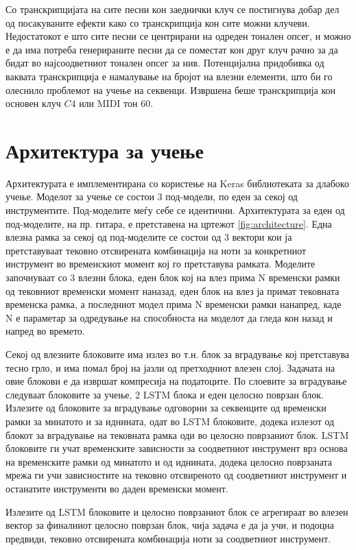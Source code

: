 Со транскрипцијата на сите песни кон заеднички клуч се постигнува добар дел од посакуваните ефекти како со транскрипција кон сите можни клучеви. Недостатокот е што сите песни се центрирани на одреден тонален опсег, и можно е да има потреба генерираните песни да се поместат кон друг клуч рачно за да бидат во најсоодветниот тонален опсег за нив. Потенцијална придобивка од ваквата транскрипција е намалување на бројот на влезни елементи, што би го олеснило проблемот на учење на секвенци. Извршена беше транскрипција кон основен клуч $C4$ или MIDI тон 60.

\section{Архитектура за учење}

Архитектурата е имплементирана со користење на Keras библиотеката за длабоко учење. Моделот за учење се состои 3 под-модели, по еден за секој од инструментите. Под-моделите меѓу себе се идентични. Архитектурата за еден од под-моделите, на пр. гитара, е претставена на цртежот \ref{fig:architecture}. Една влезна рамка за секој од под-моделите се состои од 3 вектори кои ја претставуваат тековно отсвирената комбинација на ноти за конкретниот инструмент во временскиот момент кој го претставува рамката. Моделите започнуваат со 3 влезни блока, еден блок кој на влез прима N временски рамки од тековниот временски момент наназад, еден блок на влез ја примат тековната временска рамка, а последниот модел прима N временски рамки нанапред, каде N е параметар за одредување на способноста на моделот да гледа кон назад и напред во времето.

Секој од влезните блоковите има излез во т.н. блок за вградување кој претставува тесно грло, и има помал број на јазли од претходниот влезен слој. Задачата на овие блокови е да извршат компресија на податоците. По слоевите за вградување следуваат блоковите за учење, 2 LSTM блока и еден целосно поврзан блок. Излезите од блоковите за вградување одговорни за секвенците од временски рамки за минатото и за иднината, одат во LSTM блоковите, додека излезот од блокот за вградување на тековната рамка оди во целосно поврзаниот блок. LSTM блоковите ги учат временските зависности за соодветниот инструмент врз основа на временските рамки од минатото и од иднината, додека целосно поврзаната мрежа ги учи зависностите на тековно отсвиреното од соодветниот инструмент и останатите инструменти во даден временски момент. 

Излезите од LSTM блоковите и целосно поврзаниот блок се агрегираат во влезен вектор за финалниот целосно поврзан блок, чија задача е да ја учи, и подоцна предвиди, тековно отсвирената комбинација ноти за соодветниот инструмент.

